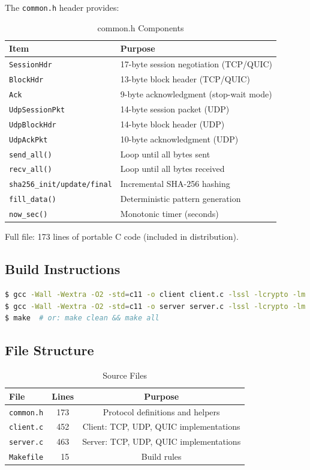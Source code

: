 \documentclass[12pt,a4paper]{article}
\begin{document}
The \texttt{common.h} header provides:

\begin{table}[H]
\centering
\caption{common.h Components}
\begin{tabular}{|l|l|}
\hline
\textbf{Item} & \textbf{Purpose} \\
\hline
\texttt{SessionHdr} & 17-byte session negotiation (TCP/QUIC) \\
\texttt{BlockHdr} & 13-byte block header (TCP/QUIC) \\
\texttt{Ack} & 9-byte acknowledgment (stop-wait mode) \\
\texttt{UdpSessionPkt} & 14-byte session packet (UDP) \\
\texttt{UdpBlockHdr} & 14-byte block header (UDP) \\
\texttt{UdpAckPkt} & 10-byte acknowledgment (UDP) \\
\texttt{send\_all()} & Loop until all bytes sent \\
\texttt{recv\_all()} & Loop until all bytes received \\
\texttt{sha256\_init/update/final} & Incremental SHA-256 hashing \\
\texttt{fill\_data()} & Deterministic pattern generation \\
\texttt{now\_sec()} & Monotonic timer (seconds) \\
\hline
\end{tabular}
\end{table}

Full file: 173 lines of portable C code (included in distribution).

\subsection{Build Instructions}

\begin{lstlisting}[language=bash,caption=Compilation]
$ gcc -Wall -Wextra -O2 -std=c11 -o client client.c -lssl -lcrypto -lm
$ gcc -Wall -Wextra -O2 -std=c11 -o server server.c -lssl -lcrypto -lm
$ make  # or: make clean && make all
\end{lstlisting}

\subsection{File Structure}

\begin{table}[H]
\centering
\caption{Source Files}
\begin{tabular}{|l|c|c|}
\hline
\textbf{File} & \textbf{Lines} & \textbf{Purpose} \\
\hline
\texttt{common.h} & 173 & Protocol definitions and helpers \\
\texttt{client.c} & 452 & Client: TCP, UDP, QUIC implementations \\
\texttt{server.c} & 463 & Server: TCP, UDP, QUIC implementations \\
\texttt{Makefile} & ~15 & Build rules \\
\hline
\end{tabular}
\end{table}
\end{document}

